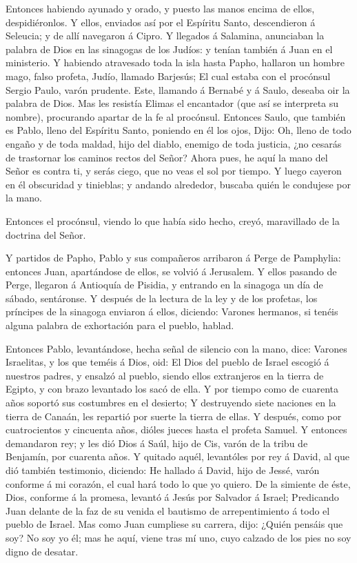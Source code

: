  Entonces habiendo ayunado y orado, y puesto las manos
encima de ellos, despidiéronlos.  Y ellos, enviados así por
el Espíritu Santo, descendieron á Seleucia; y de allí navegaron á Cipro.
 Y llegados á Salamina, anunciaban la palabra de Dios en las
sinagogas de los Judíos: y tenían también á Juan en el ministerio.
 Y habiendo atravesado toda la isla hasta Papho, hallaron un
hombre mago, falso profeta, Judío, llamado Barjesús;  El
cual estaba con el procónsul Sergio Paulo, varón prudente. Este,
llamando á Bernabé y á Saulo, deseaba oir la palabra de Dios.
 Mas les resistía Elimas el encantador (que así se
interpreta su nombre), procurando apartar de la fe al procónsul.
 Entonces Saulo, que también es Pablo, lleno del Espíritu
Santo, poniendo en él los ojos,  Dijo: Oh, lleno de todo
engaño y de toda maldad, hijo del diablo, enemigo de toda justicia, ¿no
cesarás de trastornar los caminos rectos del Señor?  Ahora
pues, he aquí la mano del Señor es contra ti, y serás ciego, que no veas
el sol por tiempo. Y luego cayeron en él obscuridad y tinieblas; y
andando alrededor, buscaba quién le condujese por la mano.

 Entonces el procónsul, viendo lo que había sido hecho,
creyó, maravillado de la doctrina del Señor.

 Y partidos de Papho, Pablo y sus compañeros arribaron á
Perge de Pamphylia: entonces Juan, apartándose de ellos, se volvió á
Jerusalem.  Y ellos pasando de Perge, llegaron á Antioquía
de Pisidia, y entrando en la sinagoga un día de sábado, sentáronse.
 Y después de la lectura de la ley y de los profetas, los
príncipes de la sinagoga enviaron á ellos, diciendo: Varones hermanos,
si tenéis alguna palabra de exhortación para el pueblo, hablad.

 Entonces Pablo, levantándose, hecha señal de silencio con
la mano, dice: Varones Israelitas, y los que teméis á Dios, oid:
 El Dios del pueblo de Israel escogió á nuestros padres, y
ensalzó al pueblo, siendo ellos extranjeros en la tierra de Egipto, y
con brazo levantado los sacó de ella.  Y por tiempo como de
cuarenta años soportó sus costumbres en el desierto;  Y
destruyendo siete naciones en la tierra de Canaán, les repartió por
suerte la tierra de ellas.  Y después, como por
cuatrocientos y cincuenta años, dióles jueces hasta el profeta Samuel.
 Y entonces demandaron rey; y les dió Dios á Saúl, hijo de
Cis, varón de la tribu de Benjamín, por cuarenta años.  Y
quitado aquél, levantóles por rey á David, al que dió también
testimonio, diciendo: He hallado á David, hijo de Jessé, varón conforme
á mi corazón, el cual hará todo lo que yo quiero.  De la
simiente de éste, Dios, conforme á la promesa, levantó á Jesús por
Salvador á Israel;  Predicando Juan delante de la faz de su
venida el bautismo de arrepentimiento á todo el pueblo de Israel.
 Mas como Juan cumpliese su carrera, dijo: ¿Quién pensáis
que soy? No soy yo él; mas he aquí, viene tras mí uno, cuyo calzado de
los pies no soy digno de desatar.

